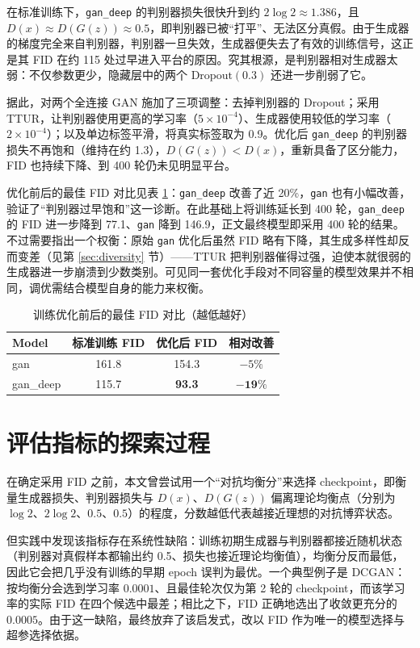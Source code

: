 \documentclass[a4paper]{article}
\begin{document}
在标准训练下，\texttt{gan\_deep} 的判别器损失很快升到约 $2\log 2\approx1.386$，且 $D(x)\approx D(G(z))\approx 0.5$，即判别器已被“打平”、无法区分真假。由于生成器的梯度完全来自判别器，判别器一旦失效，生成器便失去了有效的训练信号，这正是其 FID 在约 115 处过早进入平台的原因。究其根源，是判别器相对生成器太弱：不仅参数更少，隐藏层中的两个 $\text{Dropout}(0.3)$ 还进一步削弱了它。

据此，对两个全连接 GAN 施加了三项调整：去掉判别器的 Dropout；采用 TTUR\cite{heusel2017fid}，让判别器使用更高的学习率（$5\times10^{-4}$）、生成器使用较低的学习率（$2\times10^{-4}$）；以及单边标签平滑，将真实标签取为 0.9。优化后 \texttt{gan\_deep} 的判别器损失不再饱和（维持在约 1.3），$D(G(z))<D(x)$，重新具备了区分能力，FID 也持续下降、到 400 轮仍未见明显平台。

优化前后的最佳 FID 对比见表 \ref{tab:opt}：\texttt{gan\_deep} 改善了近 20\%，\texttt{gan} 也有小幅改善，验证了“判别器过早饱和”这一诊断。在此基础上将训练延长到 400 轮，\texttt{gan\_deep} 的 FID 进一步降到 77.1、\texttt{gan} 降到 146.9，正文最终模型即采用 400 轮的结果。不过需要指出一个权衡：原始 \texttt{gan} 优化后虽然 FID 略有下降，其生成多样性却反而变差（见第 \ref{sec:diversity} 节）——TTUR 把判别器催得过强，迫使本就很弱的生成器进一步崩溃到少数类别。可见同一套优化手段对不同容量的模型效果并不相同，调优需结合模型自身的能力来权衡。

\begin{table}[H]
\centering
\caption{训练优化前后的最佳 FID 对比（越低越好）}
\begin{tabular}{lccc}
\toprule
Model & 标准训练 FID & 优化后 FID & 相对改善 \\
\midrule
gan      & 161.8 & 154.3 & $-5\%$ \\
gan\_deep & 115.7 & \textbf{93.3} & $\mathbf{-19\%}$ \\
\bottomrule
\end{tabular}
\label{tab:opt}
\end{table}

\section{评估指标的探索过程}
\label{app:metric}
在确定采用 FID 之前，本文曾尝试用一个“对抗均衡分”来选择 checkpoint，即衡量生成器损失、判别器损失与 $D(x)$、$D(G(z))$ 偏离理论均衡点（分别为 $\log 2$、$2\log 2$、$0.5$、$0.5$）的程度，分数越低代表越接近理想的对抗博弈状态。

但实践中发现该指标存在系统性缺陷：训练初期生成器与判别器都接近随机状态（判别器对真假样本都输出约 0.5、损失也接近理论均衡值），均衡分反而最低，因此它会把几乎没有训练的早期 epoch 误判为最优。一个典型例子是 DCGAN：按均衡分会选到学习率 $0.0001$、且最佳轮次仅为第 2 轮的 checkpoint，而该学习率的实际 FID 在四个候选中最差；相比之下，FID 正确地选出了收敛更充分的 $0.0005$。由于这一缺陷，最终放弃了该启发式，改以 FID 作为唯一的模型选择与超参选择依据。
\end{document}
